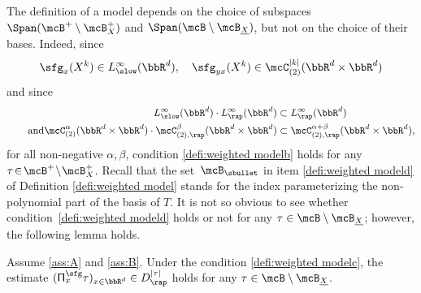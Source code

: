 The definition of a model depends on the choice of subspaces $\Span (\mcB^+\setminus\mcB_X^+)$ and $\Span (\mcB\setminus\mcB_{\underline{X}})$, but not on the choice of their bases.
Indeed, since
\[
\sfg_x(X^k)\in L_\slow^\infty(\bbR^d),\quad \sfg_{yx}(X^k)\in\mcC_{(2)}^{|k|}(\bbR^d\times\bbR^d)
\]
and since
\begin{align*}
L_\slow^\infty(\bbR^d)\cdot L_\rap^\infty(\bbR^d)&\subset L_\rap^\infty(\bbR^d)\\
\tag*{and}\mcC_{(2)}^\alpha(\bbR^d\times\bbR^d)\cdot\mcC_{(2),\rap}^\beta(\bbR^d\times\bbR^d)&\subset\mcC_{(2),\rap}^{\alpha+\beta}(\bbR^d\times\bbR^d),
\end{align*}
for all non-negative $\alpha,\beta$, condition \eqref{defi:weighted modelb} holds for any $\tau\!\in\!\mcB^+\!\setminus\!\mcB_X^+$. Recall that the set~$\mcB_\sbullet$ in item \eqref{defi:weighted modeld} of Definition \ref{defi:weighted model} stands for the index parameterizing the non-polynomial part of the basis of $T$. It is not so obvious to see whether condition~\eqref{defi:weighted modeld} holds or not for any $\tau\in\mcB\setminus\mcB_{\underline{X}}$; however, the following lemma holds.

\skpt
\begin{lem}
Assume \eqref{ass:A} and \eqref{ass:B}.
Under the condition \eqref{defi:weighted modelc}, the estimate $({\sf\Pi}_x^{\sfg}\tau)_{x\in\bbR^d}\in D_{\rap}^{|\tau|}$ holds for any $\tau\in\mcB\setminus\mcB_{\underline{X}}$.
\end{lem}

